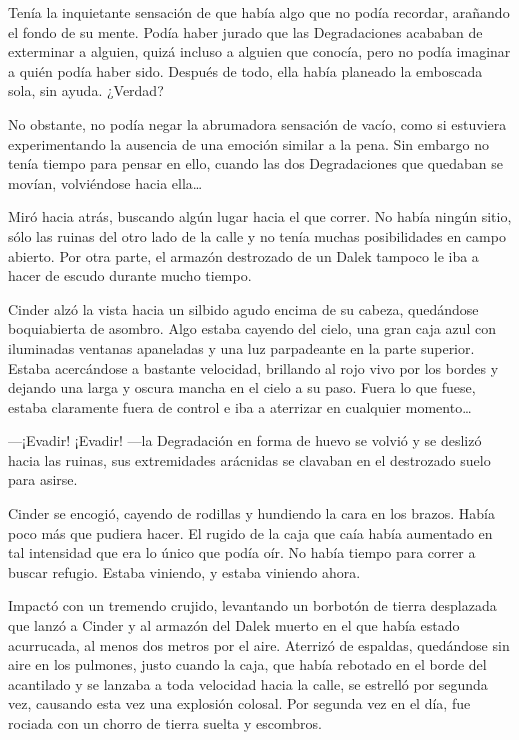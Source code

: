 Tenía la inquietante sensación de que había algo que no podía recordar, arañando el fondo de su mente. Podía haber jurado que las Degradaciones acababan de exterminar a alguien, quizá incluso a alguien que conocía, pero no podía imaginar a quién podía haber sido. Después de todo, ella había planeado la emboscada sola, sin ayuda. ¿Verdad? 

No obstante, no podía negar la abrumadora sensación de vacío, como si estuviera experimentando la ausencia de una emoción similar a la pena. Sin embargo no tenía tiempo para pensar en ello, cuando las dos Degradaciones que quedaban se movían, volviéndose hacia ella… 

Miró hacia atrás, buscando algún lugar hacia el que correr. No había ningún sitio, sólo las ruinas del otro lado de la calle y no tenía muchas posibilidades en campo abierto. Por otra parte, el armazón destrozado de un Dalek tampoco le iba a hacer de escudo durante mucho tiempo. 

Cinder alzó la vista hacia un silbido agudo encima de su cabeza, quedándose boquiabierta de asombro. Algo estaba cayendo del cielo, una gran caja azul con iluminadas ventanas apaneladas y una luz parpadeante en la parte superior. Estaba acercándose a bastante velocidad, brillando al rojo vivo por los bordes y dejando una larga y oscura mancha en el cielo a su paso. Fuera lo que fuese, estaba claramente fuera de control e iba a aterrizar en cualquier momento… 



—¡Evadir! ¡Evadir! —la Degradación en forma de huevo se volvió y se deslizó hacia las ruinas, sus extremidades arácnidas se clavaban en el destrozado suelo para asirse. 

Cinder se encogió, cayendo de rodillas y hundiendo la cara en los brazos. Había poco más que pudiera hacer. El rugido de la caja que caía había aumentado en tal intensidad que era lo único que podía oír. No había tiempo para correr a buscar refugio. Estaba viniendo, y estaba viniendo ahora. 

Impactó con un tremendo crujido, levantando un borbotón de tierra desplazada que lanzó a Cinder y al armazón del Dalek muerto en el que había estado acurrucada, al menos dos metros por el aire. Aterrizó de espaldas, quedándose sin aire en los pulmones, justo cuando la caja, que había rebotado en el borde del acantilado y se lanzaba a toda velocidad hacia la calle, se estrelló por segunda vez, causando esta vez una explosión colosal. Por segunda vez en el día, fue rociada con un chorro de tierra suelta y escombros. 

